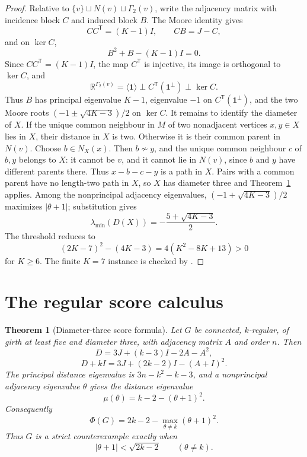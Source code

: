 \documentclass[a4paper,10pt,reqno]{amsart}
\theoremstyle{plain}
\newtheorem{theorem}{Theorem}[section]
\theoremstyle{definition}
\theoremstyle{remark}
\newcommand{\one}{\mathbf 1}
\newcommand{\resultbox}[1]{\boxed{#1}}
\newcommand{\RepoTag}{v2.3.0}
\newcommand{\codefile}[1]{%
  \href{https://github.com/SamPetkov/wow284/blob/\RepoTag/#1}{\path{#1}}}
\begin{document}
\begin{proof}
Relative to \(\{v\}\sqcup N(v)\sqcup\Gamma_2(v)\), write the adjacency
matrix with incidence block \(C\) and induced block \(B\).  The Moore identity
gives
\[
 CC^{\mathsf T}=(K-1)I,
 \qquad CB=J-C,
\]
and on \(\ker C\),
\[
 B^2+B-(K-1)I=0.
\]
Since \(CC^{\mathsf T}=(K-1)I\), the map \(C^{\mathsf T}\) is injective,
its image is orthogonal to \(\ker C\), and
\[
 \mathbb R^{\Gamma_2(v)}
 =\langle\one\rangle\perp C^{\mathsf T}(\one^\perp)\perp\ker C.
\]
Thus \(B\) has principal eigenvalue \(K-1\), eigenvalue \(-1\) on
\(C^{\mathsf T}(\one^\perp)\), and the two Moore roots
\((-1\pm\sqrt{4K-3})/2\) on \(\ker C\).  It remains to identify the
diameter of \(X\).  If the unique common neighbour in \(M\) of two
nonadjacent vertices \(x,y\in X\) lies in \(X\), their distance in \(X\)
is two.  Otherwise it is their common parent in \(N(v)\).  Choose
\(b\in N_X(x)\).  Then \(b\not\sim y\), and the unique common neighbour
\(c\) of \(b,y\) belongs to \(X\): it cannot be \(v\), and it cannot
lie in \(N(v)\), since \(b\) and \(y\) have different parents there.
Thus \(x-b-c-y\) is a path in \(X\).  Pairs with a common parent have no
length-two path in \(X\), so \(X\) has diameter three and
Theorem~\ref{thm:diameter-three-score} applies.  Among the nonprincipal
adjacency eigenvalues, \((-1+\sqrt{4K-3})/2\) maximizes
\(|\theta+1|\); substitution gives
\[
 \lambda_{\min}(D(X))=-\frac{5+\sqrt{4K-3}}2.
\]
The threshold reduces to
\[
 (2K-7)^2-(4K-3)=4(K^2-8K+13)>0
\]
for \(K\ge6\).  The finite \(K=7\) instance is checked by
\codefile{scripts/verify_wow284_38_40_42.py}.
\end{proof}

\section{The regular score calculus}\label{sec:score-calculus}

\begin{theorem}[Diameter-three score formula]\label{thm:diameter-three-score}
Let \(G\) be connected, \(k\)-regular, of girth at least five and diameter
three, with adjacency matrix \(A\) and order \(n\).  Then
\[
 D=3J+(k-3)I-2A-A^2,
\]
\[
 D+kI=3J+(2k-2)I-(A+I)^2.
\]
The principal distance eigenvalue is \(3n-k^2-k-3\), and a nonprincipal
adjacency eigenvalue \(\theta\) gives the distance eigenvalue
\[
 \mu(\theta)=k-2-(\theta+1)^2.
\]
Consequently
\[
 \resultbox{
 \Phi(G)=2k-2-\max_{\theta\ne k}(\theta+1)^2.
 }
\]
Thus \(G\) is a strict counterexample exactly when
\[
 |\theta+1|<\sqrt{2k-2}
 \qquad(\theta\ne k).
\]
\end{theorem}
\end{document}
